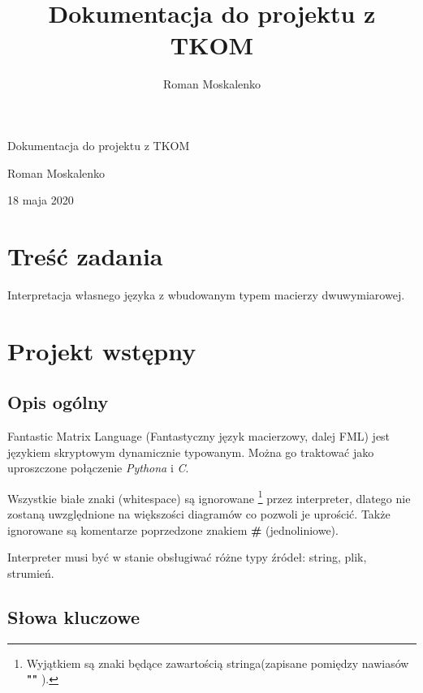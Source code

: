 \documentclass[12pt,a4paper]{article}
\title{Dokumentacja do projektu z TKOM}
\author{Roman Moskalenko}
\begin{document}
 \begin{titlepage}
    \centering
    \vspace*{\fill}

    \vspace*{0.5cm}

    \huge
    Dokumentacja do projektu z TKOM

    \vspace*{0.5cm}

    \large Roman Moskalenko
    
    \large 18 maja 2020

    \vspace*{\fill}
    \end{titlepage}
\pagebreak
\tableofcontents
\pagebreak

\section{Treść zadania}
Interpretacja własnego języka z wbudowanym typem macierzy dwuwymiarowej.

\section{Projekt wstępny}
\subsection{Opis ogólny}

Fantastic Matrix Language (Fantastyczny język macierzowy, dalej FML) jest językiem skryptowym dynamicznie typowanym. Można go traktować jako uproszczone połączenie \emph{Pythona} i \emph{C}.

Wszystkie białe znaki (whitespace) są ignorowane
\footnote{Wyjątkiem są znaki będące zawartością stringa(zapisane pomiędzy nawiasów \textbf{"" }).}
 przez interpreter, dlatego nie zostaną uwzględnione na większości diagramów co pozwoli je uprościć. Także ignorowane są komentarze poprzedzone znakiem \textbf{\#} (jednoliniowe).

Interpreter musi być w stanie obsługiwać różne typy źródeł: string, plik, strumień.


%
%
\subsection{Słowa kluczowe}
\end{document}
